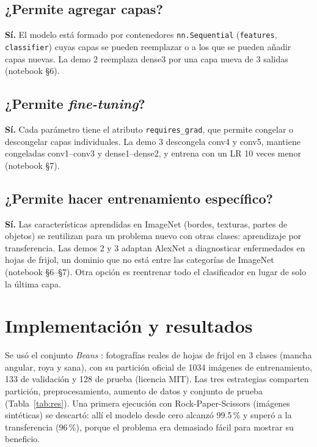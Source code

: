 \documentclass[12pt,a4paper]{article}
\begin{document}
\subsection{¿Permite agregar capas?}

\textbf{Sí.} El modelo está formado por contenedores \texttt{nn.Sequential} (\texttt{features},
\texttt{classifier}) cuyas capas se pueden reemplazar o a los que se pueden añadir capas nuevas. La
demo 2 reemplaza dense3 por una capa nueva de 3 salidas (notebook §6).

\subsection{¿Permite \textit{fine-tuning}?}

\textbf{Sí.} Cada parámetro tiene el atributo \texttt{requires\_grad}, que permite congelar o
descongelar capas individuales. La demo 3 descongela conv4 y conv5, mantiene congeladas conv1--conv3
y dense1--dense2, y entrena con un LR 10 veces menor (notebook §7).

\subsection{¿Permite hacer entrenamiento específico?}

\textbf{Sí.} Las características aprendidas en ImageNet (bordes, texturas, partes de objetos) se
reutilizan para un problema nuevo con otras clases: aprendizaje por transferencia. Las demos 2 y 3
adaptan AlexNet a diagnosticar enfermedades en hojas de frijol, un dominio que no está entre las
categorías de ImageNet (notebook §6–§7). Otra opción es reentrenar todo el clasificador en lugar de
solo la última capa.

\section{Implementación y resultados}

Se usó el conjunto \textit{Beans} \parencite{makerere2020beans}: fotografías reales de hojas de frijol
en 3 clases (mancha angular, roya y sana), con su partición oficial de 1034 imágenes de
entrenamiento, 133 de validación y 128 de prueba (licencia MIT). Las tres estrategias comparten
partición, preprocesamiento, aumento de datos y conjunto de prueba (Tabla~\ref{tab:res}). Una
primera ejecución con Rock-Paper-Scissors (imágenes sintéticas) se descartó: allí el modelo desde
cero alcanzó 99.5\,\% y superó a la transferencia (96\,\%), porque el problema era demasiado fácil para
mostrar su beneficio.
\end{document}

